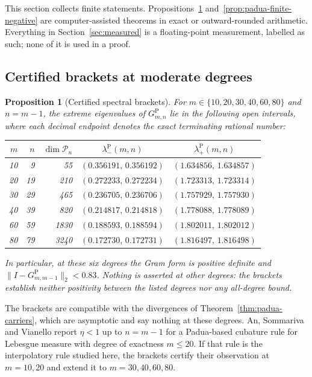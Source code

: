 \documentclass[preprint,12pt,a4paper]{elsarticle}
\newtheorem{proposition}[theorem]{Proposition}
\theoremstyle{remark}
\newcommand{\Pa}{\mathrm P}
\begin{document}
This section collects finite statements. Propositions~\ref{prop:padua-brackets}
and~\ref{prop:padua-finite-negative} are computer-assisted theorems in exact
or outward-rounded arithmetic. Everything in Section~\ref{sec:measured} is a
floating-point measurement, labelled as such; none of it is used in a proof.

\subsection{Certified brackets at moderate degrees}

\begin{proposition}[Certified spectral brackets]\label{prop:padua-brackets}
For $m\in\{10,20,30,40,60,80\}$ and $n=m-1$, the extreme eigenvalues of
$G^\Pa_{m,n}$ lie in the following open intervals, where each decimal endpoint
denotes the exact terminating rational number:
\begin{center}
\begin{tabular}{rrrcc}\toprule
$m$ & $n$ & $\dim\mathcal P_n$ & $\lambda^\Pa_-(m,n)$ & $\lambda^\Pa_+(m,n)$\\\midrule
10 & 9  & 55   & $(0.356191,\,0.356192)$ & $(1.634856,\,1.634857)$\\
20 & 19 & 210  & $(0.272233,\,0.272234)$ & $(1.723313,\,1.723314)$\\
30 & 29 & 465  & $(0.236705,\,0.236706)$ & $(1.757929,\,1.757930)$\\
40 & 39 & 820  & $(0.214817,\,0.214818)$ & $(1.778088,\,1.778089)$\\
60 & 59 & 1830 & $(0.188593,\,0.188594)$ & $(1.802011,\,1.802012)$\\
80 & 79 & 3240 & $(0.172730,\,0.172731)$ & $(1.816497,\,1.816498)$\\\bottomrule
\end{tabular}
\end{center}
In particular, at these six degrees the Gram form is positive definite and
$\|I-G^\Pa_{m,m-1}\|_2<0.83$. Nothing is asserted at other degrees: the brackets
establish neither positivity between the listed degrees nor any
all-degree bound.
\end{proposition}

The brackets are compatible with the divergences of Theorem~\ref{thm:padua-carriers},
which are asymptotic and say nothing at these degrees. An, Sommariva and Vianello
\cite{ASV27} report $\eta<1$ up to $n=m-1$ for a Padua-based cubature rule for
Lebesgue measure with degree of exactness $m\le20$. If that rule is the
interpolatory rule studied here, the brackets certify their observation at
$m=10,20$ and extend it to $m=30,40,60,80$.
\end{document}
